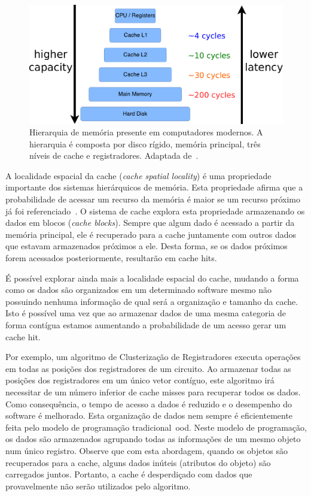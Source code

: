 \begin{figure}[ht]
    \centering
    \includegraphics[width=0.7\linewidth]{img/tecnica/memoryHierarchy}
    \caption[Hierarquia de memória]{Hierarquia de memória presente em computadores modernos. A hierarquia é composta por disco rígido, memória principal, três níveis de cache e registradores. Adaptada de~\cite{patterson2013computer}.}
    \label{fig:memoryHierarchy}
\end{figure}

A localidade espacial da cache (\textit{cache spatial locality}) é uma propriedade importante dos sistemas hierárquicos de memória. Esta propriedade afirma que a probabilidade de acessar um recurso da memória é maior se um recurso próximo já foi referenciado~\cite{patterson2013computer}. O sistema de cache explora esta propriedade armazenando os dados em blocos (\textit{cache blocks}). Sempre que algum dado é acessado a partir da memória principal, ele é recuperado para a cache juntamente com outros dados que estavam armazenados próximos a ele. Desta forma, se os dados próximos forem acessados posteriormente, resultarão em cache hits.

É possível explorar ainda mais a localidade espacial do cache, mudando a forma como os dados são organizados em um determinado software mesmo não possuindo nenhuma informação de qual será a organização e tamanho da cache.
Isto é possível uma vez que ao armazenar dados de uma mesma categoria de forma contígua estamos aumentando a probabilidade de um acesso gerar um cache hit.

Por exemplo, um algoritmo de Clusterização de Registradores executa operações em todas as posições dos registradores de um circuito.
Ao armazenar todas as posições dos registradores em um único vetor contíguo, este algoritmo irá necessitar de um número inferior de cache misses para recuperar todos os dados.
Como consequência, o tempo de acesso a dados é reduzido e o desempenho do software é melhorado. Esta organização de dados nem sempre é eficientemente feita pelo modelo de programação tradicional~\ac{ood}.
Neste modelo de programação, os dados são armazenados agrupando todas as informações de um mesmo objeto num único registro.
Observe que com esta abordagem, quando os objetos são recuperados para a cache, alguns dados inúteis (atributos do objeto) são carregados juntos. Portanto, a cache é desperdiçado com dados que provavelmente não serão utilizados pelo algoritmo.

